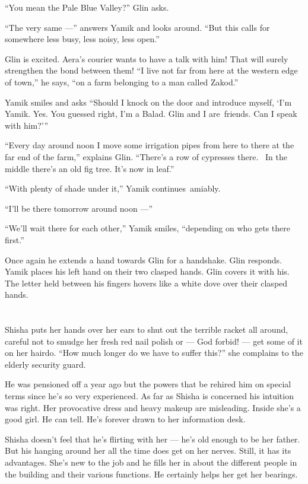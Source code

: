 \documentclass[twoside,11pt,openany]{book}
\begin{document}
``You mean the Pale Blue Valley?'' Glin asks.

``The very same ---'' answers Yamik and looks around. ``But this calls for
somewhere less busy, less noisy, less open.''

Glin is excited.  Aera's courier wants to have a talk with him! That will surely strengthen the bond between them!
``I live not far from here at the western edge of town,'' he says, ``on a farm
belonging to a man called Zakod.''

Yamik smiles and asks ``Should I knock on the door and introduce myself, `I'm Yamik. Yes. You guessed
right, I'm a Balad. Glin and I are~friends. Can I speak with him?{}'\thinspace''

``Every day around noon I move some irrigation pipes from here to there at the far end of the farm,''
explains Glin. ``There's a row of cypresses there. ~In the middle there's an old fig tree. It's now in
leaf.''

``With plenty of shade under it,'' Yamik continues~amiably.

``I'll be there tomorrow around noon ---''

``We'll wait there for each other,'' Yamik smiles, ``depending on who gets there
first.''

Once again he extends a hand towards Glin for a handshake. Glin responds. Yamik places his left hand on their two
clasped hands. Glin covers it with his. The letter held between his fingers hovers like a white dove over their clasped
hands.


\bigskip

\chapter{}

Shisha puts her hands over her ears to shut out the terrible racket all around, careful not to smudge her fresh red nail
polish or --- God forbid! --- get some of it on her hairdo. ``How much longer do we have to suffer
this?'' she complains to the elderly security guard.

He was pensioned off a year ago but the powers that be rehired him on special terms since he's so very experienced. As
far as Shisha is concerned his intuition was right. Her provocative dress and heavy makeup are misleading. Inside she's
a good girl. He can tell. He's forever drawn to her information desk.

Shisha doesn't feel that he's flirting with her ---  he's old enough to be her father. But his hanging around her all
the time does get on her nerves. Still, it has its advantages. She's new to the job and he fills her in about the
different people in the building and their various functions. He certainly helps her get her bearings.
\end{document}
